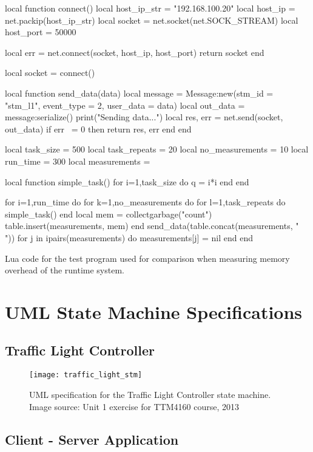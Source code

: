 \begin{appendices}
\begin{listing}[htp]
\begin{luacode}
local function connect()
	local host_ip_str = "192.168.100.20"
	local host_ip = net.packip(host_ip_str)
	local socket = net.socket(net.SOCK_STREAM)
	local host_port = 50000

	local err = net.connect(socket, host_ip, host_port)
	return socket
end

local socket = connect()

local function send_data(data)
	local message = Message:new({stm_id = "stm_l1", event_type = 2, user_data = data})
	local out_data = message:serialize()
	print("Sending data...")
	local res, err = net.send(socket, out_data)
	if err ~= 0 then
		return res, err
	end
end

local task_size = 500
local task_repeats = 20
local no_measurements = 10
local run_time = 300
local measurements = {}

local function simple_task()
	for i=1,task_size do
		q = i*i
	end
end

for i=1,run_time do
	for k=1,no_measurements do
		for l=1,task_repeats do
			simple_task()
		end
		local mem = collectgarbage("count")
		table.insert(measurements, mem)
	end
	send_data(table.concat(measurements, " "))
	for j in ipairs(measurements) do
		measurements[j] = nil
	end
end
\end{luacode}
	\caption{Lua code for the test program used for comparison when measuring memory overhead of the runtime system.}
	\label{code:memory_overhead_test}
\end{listing}

\FloatBarrier
\chapter{UML State Machine Specifications}
\label{app:stm_uml}

\section{Traffic Light Controller}
\label{uml:traffic_light}

\begin{figure}[htp]
	\centering
	\texttt{[image: traffic\_light\_stm]}
	\caption[UML specification for Traffic Light Controller]{UML specification for the Traffic Light Controller state machine. Image source: Unit 1 exercise for TTM4160 course, 2013}
	\label{fig:traffic_light_uml}
\end{figure}

\FloatBarrier
\section{Client - Server Application}
\label{uml:client_server}


\end{appendices}
